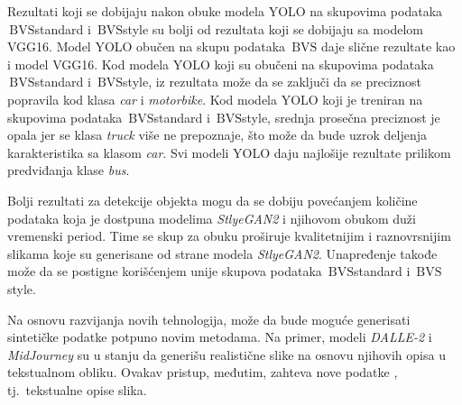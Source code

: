 \documentclass[12pt,oneside]{memoir}
\newcommand{\bvs}{\ensuremath{\,\textrm{BVS}}}
\begin{document}
Rezultati koji se dobijaju nakon obuke modela YOLO na skupovima podataka \bvs{standard} i \bvs{style} su bolji od rezultata koji se dobijaju sa modelom VGG16. Model YOLO obučen na skupu podataka \bvs{} daje slične rezultate kao i model VGG16. Kod modela YOLO koji su obučeni na skupovima podataka \bvs{standard} i \bvs{style}, iz rezultata može da se zaključi da se preciznost popravila kod klasa \textit{car} i \textit{motorbike}. Kod modela YOLO koji je treniran na skupovima podataka \bvs{standard} i \bvs{style}, srednja prosečna preciznost je opala jer se klasa \textit{truck} više ne prepoznaje, što može da bude uzrok deljenja karakteristika sa klasom \textit{car}. Svi modeli YOLO daju najlošije rezultate prilikom predviđanja klase \textit{bus}.

Bolji rezultati za detekcije objekta mogu da se dobiju povećanjem količine podataka koja je dostpuna modelima \textit{StlyeGAN2} i njihovom obukom duži vremenski period. Time se skup za obuku proširuje kvalitetnijim i raznovrsnijim slikama koje su generisane od strane modela \textit{StlyeGAN2}.
Unapređenje takođe može da se postigne korišćenjem unije skupova podataka \bvs{standard} i \bvs{style}.

Na osnovu razvijanja novih tehnologija, može da bude moguće generisati sintetičke podatke potpuno novim metodama. Na primer, modeli \textit{DALLE-2} \cite{reddy2021dall} i \textit{MidJourney} \cite{midjourney2022} su u stanju da generišu realistične slike na osnovu njihovih opisa u tekstualnom obliku. Ovakav pristup, međutim, zahteva nove podatke
, tj.~tekstualne opise slika.


\end{document}
